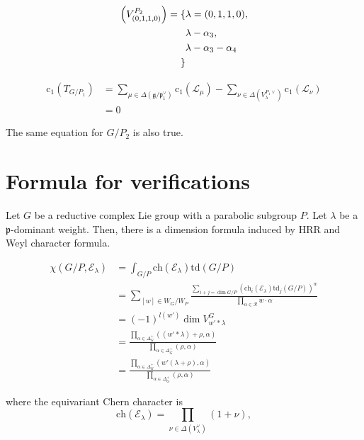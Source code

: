 \documentclass[uplatex,dvipdfmx]{jsarticle}
\newcommand{\ch}[1]{\mathrm{ch}\left( {#1} \right)}
\newcommand{\td}[1]{\mathrm{td}\left( {#1} \right)}
\begin{document}
\begin{equation}
    \begin{alignedat}
        \Delta\left( V^{P_2}_{(0, 1, 1, 0)} \right)
        =
        \{
            &\lambda = (0, 1, 1, 0),\\
            &\lambda - \alpha_3,\\
            &\lambda - \alpha_3 - \alpha_4\\
        \}
    \end{alignedat}
\end{equation}

\begin{align}
    \mathrm{c}_1(T_{G/P_1})
    &=
    \sum_{\mu \in \Delta(\mathfrak{g}/\mathfrak{p}_1^\vee)}\mathrm{c}_1(\mathcal{L}_\mu)
    -
    \sum_{\nu \in \Delta(V^{P_1\vee}_\lambda)}\mathrm{c}_1(\mathcal{L}_\nu)\\
    &=
    0
\end{align}

The same equation for
$G/P_2$
is also true.


\section{Formula for verifications}

Let
$G$
be a reductive complex Lie group with a parabolic subgroup
$P$.
Let
$\lambda$
be a
$\mathfrak{p}$-dominant
weight.
Then, there is a dimension formula 
induced by HRR and Weyl character formula.

\begin{align}
    \chi \left( G/P, \mathcal{E}_\lambda \right)
    &=
    \int_{G/P}
    \ch{\mathcal{E}_\lambda}
    \td{G/P}\\
    &= \sum_{
        [w] \in W_G / W_P
    }
    \frac
    {\sum_{i + j = \operatorname{dim} G/P}(\mathrm{ch}_i \left( \mathcal{E}_\lambda \right)
    \mathrm{td}_j\left( G/P \right))^w}
    {\prod_{\alpha \in \mathcal{R}} w \cdot \alpha}\\
    &=
    (-1)^{l(w')}\operatorname{dim} V^G_{w' * \lambda}\\
    &=
    \frac
    {\prod_{\alpha \in \Delta_G^+}((w'*\lambda) + \rho, \alpha)}
    {\prod_{\alpha \in \Delta_G^+}(\rho, \alpha)}\\
    &=
    \frac
    {\prod_{\alpha \in \Delta_G^+}(w'(\lambda + \rho), \alpha)}
    {\prod_{\alpha \in \Delta_G^+}(\rho, \alpha)}
\end{align}

where the equivariant Chern character is 
\begin{equation}
    \ch{\mathcal{E}_\lambda} = \prod_{\nu \in \Delta(V_\lambda^\vee)}(1 + \nu),
\end{equation}
\end{document}

